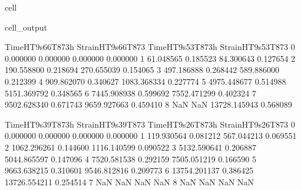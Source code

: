 \documentclass[letterpaper,10pt,english]{jupyterBook}
\begin{document}
\begin{sphinxuseclass}{cell}
\begin{sphinxVerbatimOutput}
			\begin{sphinxuseclass}{cell_output}
				\begin{sphinxVerbatim}[commandchars=\\\{\}]
					Time\PYGZus{}HT9s66T873h  Strain\PYGZus{}HT9s66T873  Time\PYGZus{}HT9s53T873h  Strain\PYGZus{}HT9s53T873  \PYGZbs{}
					0          0.000000           0.000000          0.000000           0.000000   
					1         61.048565           0.185523         84.300643           0.127654   
					2        190.558800           0.218694        270.655039           0.154065   
					3        497.186888           0.268442        589.886000           0.212399   
					4        909.862070           0.340627       1083.368334           0.227774   
					5       4975.448677           0.514988       5151.369792           0.348565   
					6       7445.908938           0.599692       7552.471299           0.402324   
					7       9502.628340           0.671743       9659.927663           0.459410   
					8               NaN                NaN      13728.145943           0.568089   
					
					Time\PYGZus{}HT9s39T873h  Strain\PYGZus{}HT9s39T873  Time\PYGZus{}HT9s26T873h  Strain\PYGZus{}HT9s26T873  
					0          0.000000           0.000000          0.000000           0.000000  
					1        119.930564           0.081212        567.044213           0.069551  
					2       1062.296261           0.144600       1116.140599           0.090522  
					3       5132.590641           0.206887       5044.865597           0.147096  
					4       7520.581538           0.292159       7505.051219           0.166590  
					5       9663.638215           0.310601       9546.812816           0.209773  
					6      13754.201137           0.386425      13726.554211           0.254514  
					7               NaN                NaN               NaN                NaN  
					8               NaN                NaN               NaN                NaN  
				\end{sphinxVerbatim}
				
				\noindent{}
				
		\end{sphinxuseclass}\end{sphinxVerbatimOutput}
		
	\end{sphinxuseclass}
	
\end{document}

